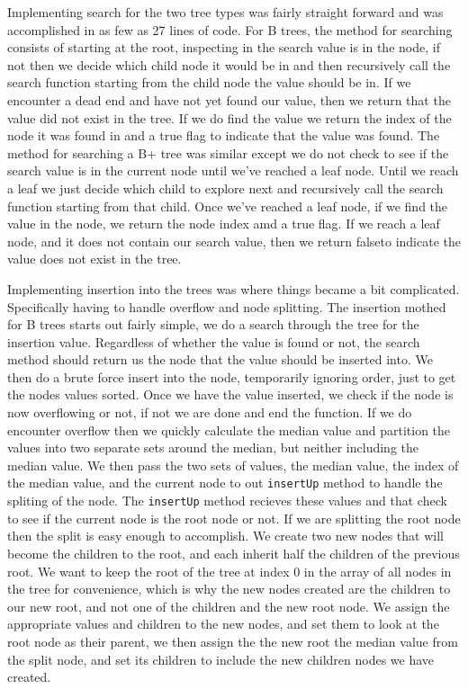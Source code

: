 Implementing search for the two tree types was fairly straight forward
and was accomplished in as few as 27 lines of code.  For B trees, the
method for searching consists of starting at the root, inspecting in
the search value is in the node, if not then we decide which child
node it would be in and then recursively call the search function
starting from the child node the value should be in.  If we encounter
a dead end and have not yet found our value, then we return that the
value did not exist in the tree.  If we do find the value we return
the index of the node it was found in and a true flag to indicate that
the value was found.  The method for searching a B+ tree was similar
except we do not check to see if the search value is in the current
node until we've reached a leaf node.  Until we reach a leaf we just
decide which child to explore next and recursively call the search
function starting from that child.  Once we've reached a leaf node, if
we find the value in the node, we return the node index amd a true
flag.  If we reach a leaf node, and it does not contain our search
value, then we return falseto indicate the value does not exist in the
tree.

Implementing insertion into the trees was where things became a bit
complicated.  Specifically having to handle overflow and node
splitting.  The insertion mothed for B trees starts out fairly simple,
we do a search through the tree for the insertion value.  Regardless
of whether the value is found or not, the search method should return
us the node that the value should be inserted into.  We then do a
brute force insert into the node, temporarily ignoring order, just to
get the nodes values sorted.  Once we have the value inserted, we
check if the node is now overflowing or not, if not we are done and
end the function.  If we do encounter overflow then we quickly
calculate the median value and partition the values into two separate
sets around the median, but neither including the median value.  We
then pass the two sets of values, the median value, the index of the
median value, and the current node to out \texttt{insertUp} method to
handle the spliting of the node.  The \texttt{insertUp} method
recieves these values and that check to see if the current node is the
root node or not.  If we are splitting the root node then the split is
easy enough to accomplish.  We create two new nodes that will become
the children to the root, and each inherit half the children of the
previous root.  We want to keep the root of the tree at index 0 in the
array of all nodes in the tree for convenience, which is why the new
nodes created are the children to our new root, and not one of the
children and the new root node.  We assign the appropriate values and
children to the new nodes, and set them to look at the root node as
their parent, we then assign the the new root the median value from
the split node, and set its children to include the new children nodes
we have created.

